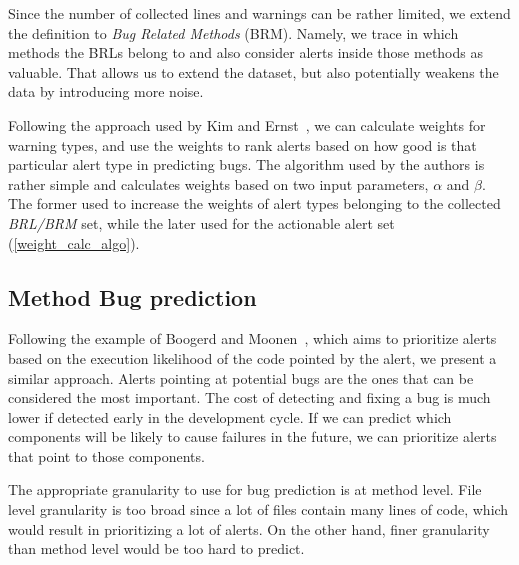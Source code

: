
Since the number of collected lines and warnings can be rather limited, we extend the definition to \textit{Bug Related Methods} (BRM). Namely, we trace in which methods the BRLs belong to and also consider alerts inside those methods as valuable. That allows us to extend the dataset, but also potentially weakens the data by introducing more noise.

Following the approach used by Kim and Ernst~\cite{which_warnings}, we can calculate weights for warning types, and use the weights to rank alerts based on how good is that particular alert type in predicting bugs. The algorithm used by the authors is rather simple and calculates weights based on two input parameters, $\alpha$ and $\beta$. The former used to increase the weights of alert types belonging to the collected \textit{BRL/BRM} set, while the later used for the actionable alert set (\cref{weight_calc_algo}).


\subsection{Method Bug prediction}

Following the example of Boogerd and Moonen~\cite{static_profiling}, which aims to prioritize alerts based on the execution likelihood of the code pointed by the alert, we present a similar approach. Alerts pointing at potential bugs are the ones that can be considered the most important. The cost of detecting and fixing a bug is much lower if detected early in the development cycle. If we can predict which components will be likely to cause failures in the future, we can prioritize alerts that point to those components.

The appropriate granularity to use for bug prediction is at method level. File level granularity is too broad since a lot of files contain many lines of code, which would result in prioritizing a lot of alerts. On the other hand, finer granularity than method level would be too hard to predict.

